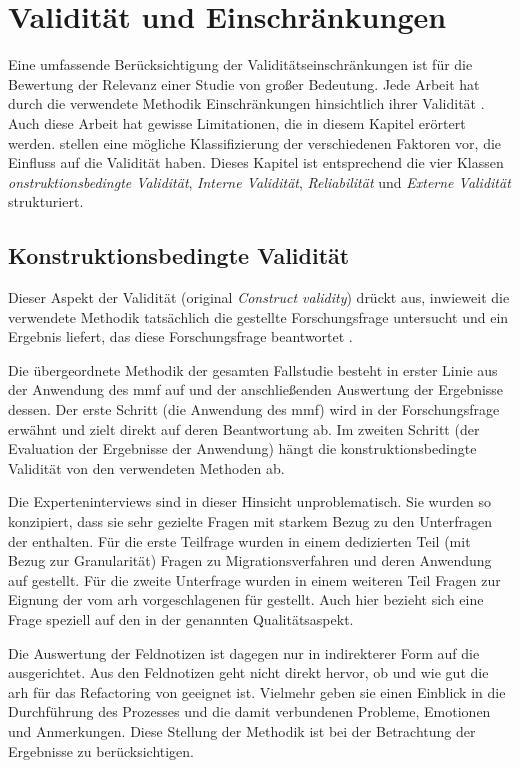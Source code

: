 \chapter{Validität und Einschränkungen}
\label{chap:gueltigkeit}

Eine umfassende Berücksichtigung der Validitätseinschränkungen ist für die Bewertung der Relevanz einer Studie von großer Bedeutung. 
Jede Arbeit hat durch die verwendete Methodik Einschränkungen hinsichtlich ihrer Validität \cite{campbell2015experimental}.
Auch diese Arbeit hat gewisse Limitationen, die in diesem Kapitel erörtert werden.
 stellen eine mögliche Klassifizierung der verschiedenen Faktoren vor, die Einfluss auf die Validität haben.
Dieses Kapitel ist entsprechend die vier Klassen \emph{onstruktionsbedingte Validität}, \emph{Interne Validität}, \emph{Reliabilität} und \emph{Externe Validität} strukturiert.

\section{Konstruktionsbedingte Validität}

Dieser Aspekt der Validität (original \emph{Construct validity}) drückt aus, inwieweit die verwendete Methodik tatsächlich die gestellte Forschungsfrage untersucht und ein Ergebnis liefert, das diese Forschungsfrage beantwortet \cite{Runeson2009}.

Die übergeordnete Methodik der gesamten Fallstudie besteht in erster Linie aus der Anwendung des \gls{mmf} auf \jf und der anschließenden Auswertung der Ergebnisse dessen.
Der erste Schritt (die Anwendung des \gls{mmf}) wird in der Forschungsfrage erwähnt und zielt direkt auf deren Beantwortung ab.
Im zweiten Schritt (der Evaluation der Ergebnisse der Anwendung) hängt die konstruktionsbedingte Validität von den verwendeten Methoden ab.

Die Experteninterviews sind in dieser Hinsicht unproblematisch. 
Sie wurden so konzipiert, dass sie sehr gezielte Fragen mit starkem Bezug zu den Unterfragen der \ff enthalten.
Für die erste Teilfrage wurden in einem dedizierten Teil (mit Bezug zur Granularität) Fragen zu Migrationsverfahren und deren Anwendung auf \jf gestellt.
Für die zweite Unterfrage wurden in einem weiteren Teil Fragen zur Eignung der vom \gls{arh} vorgeschlagenen \bpp für \jf gestellt.
Auch hier bezieht sich eine Frage speziell auf den in der \ff genannten Qualitätsaspekt.

Die Auswertung der Feldnotizen ist dagegen nur in indirekterer Form auf die \ff ausgerichtet.
Aus den Feldnotizen geht nicht direkt hervor, ob und wie gut die \gls{arh} für das Refactoring von \jf geeignet ist. 
Vielmehr geben sie einen Einblick in die Durchführung des Prozesses und die damit verbundenen Probleme, Emotionen und Anmerkungen. 
Diese Stellung der Methodik ist bei der Betrachtung der Ergebnisse zu berücksichtigen.

